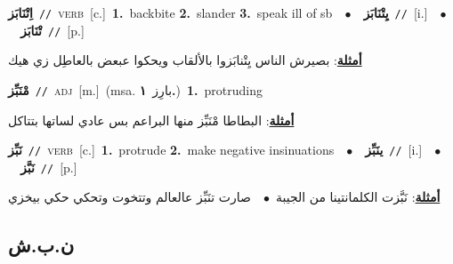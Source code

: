 \documentclass[10pt,a4paper,twoside]{article} %
\begin{document}
\begin{multicols}{2}
{{{{\setlength\topsep{0pt}\textbf{\foreignlanguage{arabic}{اِتْنَابَز}}\ {\color{gray}\texttt{//}\color{black}}\ \textsc{verb}\ [c.]\ \textbf{1.}~backbite  \textbf{2.}~slander  \textbf{3.}~speak ill of sb\ \ $\bullet$\ \ \setlength\topsep{0pt}\textbf{\foreignlanguage{arabic}{يِتْنَابَز}}\ {\color{gray}\texttt{//}\color{black}}\ [i.]\ \ $\bullet$\ \ \setlength\topsep{0pt}\textbf{\foreignlanguage{arabic}{تْنَابَز}}\ {\color{gray}\texttt{//}\color{black}}\ [p.]\  \begin{flushright}\color{gray}\foreignlanguage{arabic}{\textbf{\underline{\foreignlanguage{arabic}{أمثلة}}}: بصيرش الناس يِتْنابَزوا بالألقاب ويحكوا عبعض بالعاطِل زي هيك}\end{flushright}\color{black}} \vspace{2mm}

{\setlength\topsep{0pt}\textbf{\foreignlanguage{arabic}{مْنَبِّز}}\ {\color{gray}\texttt{//}\color{black}}\ \textsc{adj}\ [m.]\ \color{gray}(msa. \foreignlanguage{arabic}{بارِز}~\foreignlanguage{arabic}{\textbf{١.}})\color{black}\ \textbf{1.}~protruding\  \begin{flushright}\color{gray}\foreignlanguage{arabic}{\textbf{\underline{\foreignlanguage{arabic}{أمثلة}}}: البطاطا مْنَبِّز منها البراعم بس عادي لساتها بتتاكل}\end{flushright}\color{black}} \vspace{2mm}

{\setlength\topsep{0pt}\textbf{\foreignlanguage{arabic}{نَبِّز}}\ {\color{gray}\texttt{//}\color{black}}\ \textsc{verb}\ [c.]\ \textbf{1.}~protrude  \textbf{2.}~make negative insinuations\ \ $\bullet$\ \ \setlength\topsep{0pt}\textbf{\foreignlanguage{arabic}{ينَبِّز}}\ {\color{gray}\texttt{//}\color{black}}\ [i.]\ \ $\bullet$\ \ \setlength\topsep{0pt}\textbf{\foreignlanguage{arabic}{نَبَّز}}\ {\color{gray}\texttt{//}\color{black}}\ [p.]\  \begin{flushright}\color{gray}\foreignlanguage{arabic}{\textbf{\underline{\foreignlanguage{arabic}{أمثلة}}}: نَبَّزت الكلمانتينا من الجيبة\ $\bullet$\ \  صارت تنَبِّز عالعالم وتتخوت وتحكي حكي بيخزي}\end{flushright}\color{black}} \vspace{2mm}

\vspace{-3mm}
\subsection*{\color{blue}\foreignlanguage{arabic}{ن.ب.ش}\color{blue}{}} 

}}}
\end{multicols}
\end{document}
